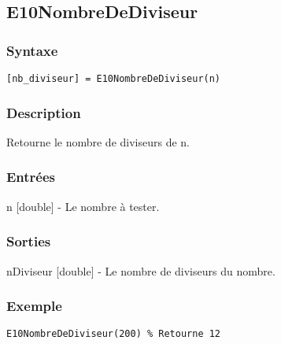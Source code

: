 \begin{minipage}{\linewidth}
\subsection*{E10NombreDeDiviseur}
\subsubsection*{Syntaxe}
\begin{lstlisting}
[nb_diviseur] = E10NombreDeDiviseur(n)
\end{lstlisting}
\subsubsection*{Description}
Retourne le nombre de diviseurs de n.
\subsubsection*{Entrées}
\begin{description}
\item n [double] - Le nombre à tester. 
\end{description} \subsubsection*{Sorties}
\begin{description}
\item nDiviseur [double] - Le nombre de diviseurs du nombre. 
\end{description} 
\subsubsection*{Exemple}
\begin{lstlisting}
E10NombreDeDiviseur(200) % Retourne 12
\end{lstlisting} \medskip
\end{minipage}